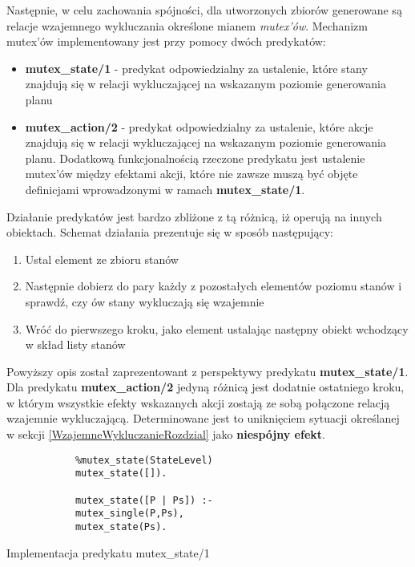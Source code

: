     
    Następnie, w celu zachowania spójności, dla utworzonych zbiorów 
    generowane są relacje wzajemnego wykluczania określone mianem \textit{mutex'ów}. Mechanizm mutex'ów implementowany jest przy pomocy dwóch predykatów:
    \begin{itemize}
        \item \textbf{mutex\_state/1} - predykat odpowiedzialny za ustalenie, które stany znajdują się w relacji wykluczającej na wskazanym 
        poziomie generowania planu
        \item \textbf{mutex\_action/2} - predykat odpowiedzialny za ustalenie, które akcje znajdują się w relacji wykluczającej na wskazanym
        poziomie generowania planu. Dodatkową funkcjonalnością rzeczone predykatu jest ustalenie mutex'ów między efektami akcji, które 
        nie zawsze muszą być objęte definicjami wprowadzonymi w ramach \textbf{mutex\_state/1}.
    \end{itemize}

    Działanie predykatów jest bardzo zbliżone z tą różnicą, iż operują na innych obiektach. Schemat działania prezentuje się w sposób następujący:
    \begin{enumerate}
        \item Ustal element ze zbioru stanów
        \item Następnie dobierz do pary każdy z pozostałych elementów poziomu stanów i sprawdź, czy ów stany wykluczają się wzajemnie
        \item Wróć do pierwszego kroku, jako element ustalając następny obiekt wchodzący w skład listy stanów
    \end{enumerate}

    Powyższy opis został zaprezentowant z perspektywy predykatu \textbf{mutex\_state/1}. Dla predykatu \textbf{mutex\_action/2} jedyną różnicą jest 
    dodatnie ostatniego kroku, w którym wszystkie efekty wskazanych akcji zostają ze sobą połączone relacją wzajemnie wykluczającą. Determinowane 
    jest to uniknięciem sytuacji określanej w sekcji \ref{WzajemneWykluczanieRozdzial} jako \textbf{niespójny efekt}.

    \begin{listing}[H]
        \begin{verbatim}
            %mutex_state(StateLevel)
            mutex_state([]).

            mutex_state([P | Ps]) :-
            mutex_single(P,Ps),
            mutex_state(Ps).
        \end{verbatim}
    \caption{Implementacja predykatu mutex\_state/1}
    \end{listing}

